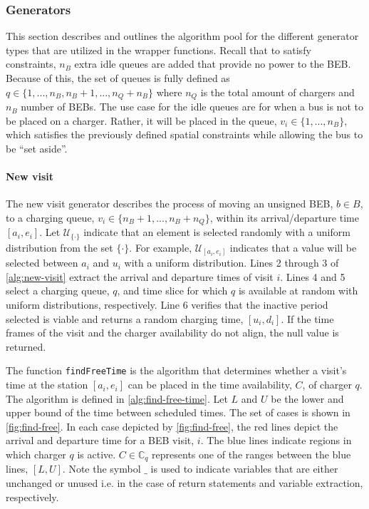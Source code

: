 \documentclass[11pt,a4paper,final]{article}
\newcommand{\C}{\mathbb{C}}                 %
\newcommand{\U}{\mathcal{U}}                %
\begin{document}
\subsubsection{Generators}
\label{sec:generators}
This section describes and outlines the algorithm pool for the different generator types that are utilized in the
wrapper functions. Recall that to satisfy constraints, \(n_B\) extra idle queues are added that provide no power to the
BEB. Because of this, the set of queues is fully defined as \(q \in \{1,..., n_B, n_B+1,..., n_Q+n_B\}\) where \(n_Q\) is the
total amount of chargers and \(n_B\) number of BEBs. The use case for the idle queues are for when a bus is not to be
placed on a charger. Rather, it will be placed in the queue, \(v_i \in \{1,..., n_B\}\), which satisfies the previously
defined spatial constraints while allowing the bus to be ``set aside''.

\paragraph{New visit}
\label{sec:new-visit}
The new visit generator describes the process of moving an unsigned BEB, \(b \in B\), to a charging queue, \(v_i \in
\{n_B+1,..., n_B + n_Q\}\), within its arrival/departure time \([a_i, e_i]\). Let \(\U_{\{\cdot\}}\) indicate that an element is
selected randomly with a uniform distribution from the set \(\{\cdot\}\). For example, \(\U_{[a_i, e_i]}\) indicates that a
value will be selected between \(a_i\) and \(u_i\) with a uniform distribution. Lines 2 through 3 of \ref{alg:new-visit}
extract the arrival and departure times of visit \(i\). Lines 4 and 5 select a charging queue, \(q\), and time slice for
which \(q\) is available at random with uniform distributions, respectively. Line 6 verifies that the inactive period
selected is viable and returns a random charging time, \([u_i, d_i]\). If the time frames of the visit and the charger
availability do not align, the null value is returned.

The function \texttt{findFreeTime} is the algorithm that determines whether a visit's time at the station \([a_i, e_i]\) can be
placed in the time availability, \(C\), of charger \(q\). The algorithm is defined in \ref{alg:find-free-time}. Let \(L\) and
\(U\) be the lower and upper bound of the time between scheduled times. The set of cases is shown in \ref{fig:find-free}. In
each case depicted by \ref{fig:find-free}, the red lines depict the arrival and departure time for a BEB visit, \(i\). The blue
lines indicate regions in which charger \(q\) is active. \(C \in \C_q\) represents one of the ranges between the blue lines,
\([L, U]\). Note the symbol \(\_\) is used to indicate variables that are either unchanged or unused i.e. in the case of
return statements and variable extraction, respectively.
\end{document}
